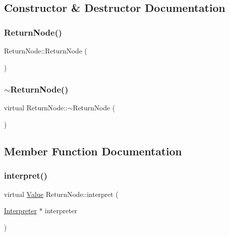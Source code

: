 \subsection{Constructor \& Destructor Documentation}
\mbox{\label{classReturnNode_a1e79c04a4e82c37af4aafa39be12b3ba}} 
\subsubsection{\texorpdfstring{Return\+Node()}{ReturnNode()}}
{\footnotesize\ttfamily Return\+Node\+::\+Return\+Node (\begin{DoxyParamCaption}{ }\end{DoxyParamCaption})}

\mbox{\label{classReturnNode_ab6ad8adf03f6c24bf9d717c6f1af7bcb}} 
\subsubsection{\texorpdfstring{$\sim$\+Return\+Node()}{~ReturnNode()}}
{\footnotesize\ttfamily virtual Return\+Node\+::$\sim$\+Return\+Node (\begin{DoxyParamCaption}{ }\end{DoxyParamCaption})\hspace{0.3cm}{\ttfamily [virtual]}}



\subsection{Member Function Documentation}
\mbox{\label{classReturnNode_ae6c35829787a4f880b3ee1fa4b2e98d3}} 
\subsubsection{\texorpdfstring{interpret()}{interpret()}}
{\footnotesize\ttfamily virtual \hyperlink{classValue}{Value} Return\+Node\+::interpret (\begin{DoxyParamCaption}\item[{\hyperlink{classInterpreter}{Interpreter} $\ast$}]{interpreter }\end{DoxyParamCaption})\hspace{0.3cm}{\ttfamily [virtual]}}



